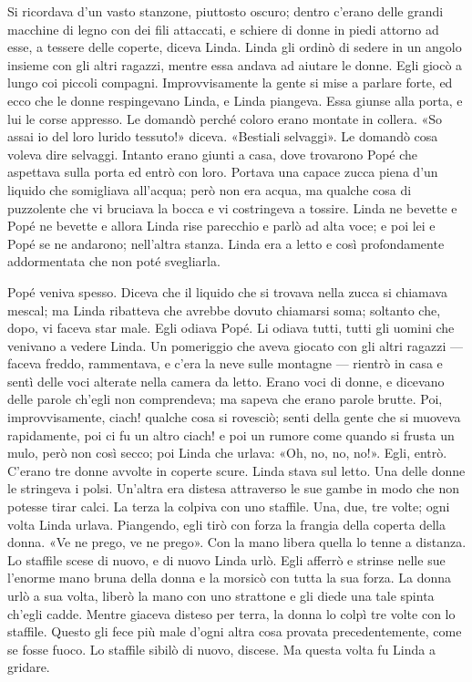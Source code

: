 \documentclass[
a5paper, %
10pt, %
twoside, 
onecolumn, %
openany, %
]{memoir}
\begin{document}
Si ricordava d’un vasto stanzone, piuttosto oscuro; dentro c’erano delle grandi macchine di legno con dei fili attaccati, e schiere di donne in piedi attorno ad esse, a tessere delle coperte, diceva Linda. Linda gli ordinò di sedere in un angolo insieme con gli altri ragazzi, mentre essa andava ad aiutare le donne. Egli giocò a lungo coi piccoli compagni. Improvvisamente la gente si mise a parlare forte, ed ecco che le donne respingevano Linda, e Linda piangeva. Essa giunse alla porta, e lui le corse appresso. Le domandò perché coloro erano montate in collera. «So assai io del loro lurido tessuto!» diceva. «Bestiali selvaggi». Le domandò cosa voleva dire selvaggi. Intanto erano giunti a casa, dove trovarono Popé che aspettava sulla porta ed entrò con loro. Portava una capace zucca piena d’un liquido che somigliava all’acqua; però non era acqua, ma qualche cosa di puzzolente che vi bruciava la bocca e vi costringeva a tossire. Linda ne bevette e Popé ne bevette e allora Linda rise parecchio e parlò ad alta voce; e poi lei e Popé se ne andarono; nell’altra stanza. Linda era a letto e così profondamente addormentata che non poté svegliarla.

Popé veniva spesso. Diceva che il liquido che si trovava nella zucca si chiamava mescal; ma Linda ribatteva che avrebbe dovuto chiamarsi soma; soltanto che, dopo, vi faceva star male. Egli odiava Popé. Li odiava tutti, tutti gli uomini che venivano a vedere Linda. Un pomeriggio che aveva giocato con gli altri ragazzi — faceva freddo, rammentava, e c’era la neve sulle montagne — rientrò in casa e sentì delle voci alterate nella camera da letto. Erano voci di donne, e dicevano delle parole ch’egli non comprendeva; ma sapeva che erano parole brutte. Poi, improvvisamente, ciach! qualche cosa si rovesciò; senti della gente che si muoveva rapidamente, poi ci fu un altro ciach! e poi un rumore come quando si frusta un mulo, però non così secco; poi Linda che urlava: «Oh, no, no, no!». Egli, entrò. C’erano tre donne avvolte in coperte scure. Linda stava sul letto. Una delle donne le stringeva i polsi. Un’altra era distesa attraverso le sue gambe in modo che non potesse tirar calci. La terza la colpiva con uno staffile. Una, due, tre volte; ogni volta Linda urlava. Piangendo, egli tirò con forza la frangia della coperta della donna. «Ve ne prego, ve ne prego». Con la mano libera quella lo tenne a distanza. Lo staffile scese di nuovo, e di nuovo Linda urlò. Egli afferrò e strinse nelle sue l’enorme mano bruna della donna e la morsicò con tutta la sua forza. La donna urlò a sua volta, liberò la mano con uno strattone e gli diede una tale spinta ch’egli cadde. Mentre giaceva disteso per terra, la donna lo colpì tre volte con lo staffile. Questo gli fece più male d’ogni altra cosa provata precedentemente, come se fosse fuoco. Lo staffile sibilò di nuovo, discese. Ma questa volta fu Linda a gridare.
\end{document}
